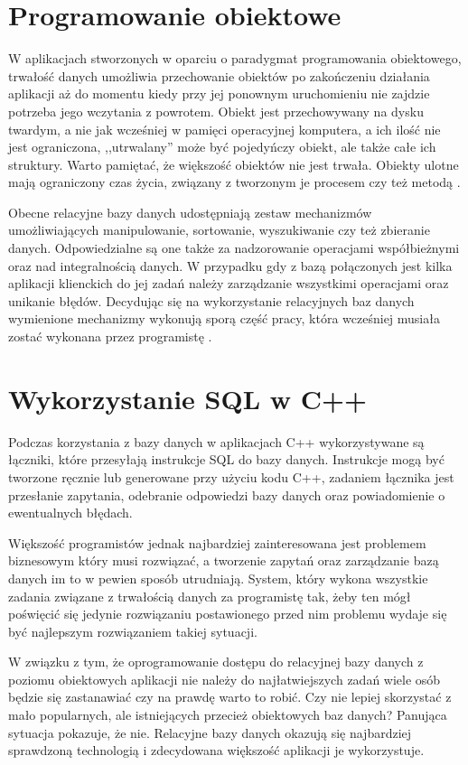 \documentclass[12pt]{report}
\begin{document}
\section{Programowanie obiektowe}

W aplikacjach stworzonych w oparciu o paradygmat programowania obiektowego, trwałość danych umożliwia przechowanie obiektów po zakończeniu działania aplikacji aż do
momentu kiedy przy jej ponownym uruchomieniu nie zajdzie potrzeba jego wczytania z powrotem. Obiekt jest przechowywany na dysku twardym, a nie jak wcześniej w pamięci
operacyjnej komputera, a ich ilość nie jest ograniczona, ,,utrwalany'' może być pojedyńczy obiekt, ale także całe ich struktury. Warto pamiętać, że większość obiektów nie jest
trwała. Obiekty ulotne mają ograniczony czas życia, związany z tworzonym je procesem czy też metodą \cite{hibernate}.

Obecne relacyjne bazy danych udostępniają zestaw mechanizmów umożliwia\-jących manipulowanie, sortowanie, wyszukiwanie czy też zbieranie danych. Odpo\-wiedzialne są 
one także za nadzorowanie operacjami współbieżnymi  oraz nad inte\-gralnością danych. W przypadku gdy z bazą połączonych jest kilka aplikacji klienckich do jej zadań należy
zarządzanie wszystkimi operacjami oraz unikanie błędów. Decydując się na wykorzystanie relacyjnych baz danych wymienione mechanizmy wykonują sporą część pracy, która
wcześniej musiała zostać wykonana przez pro\-gramistę \cite{persistence}.

\section{Wykorzystanie SQL w C++}

Podczas korzystania z bazy danych w aplikacjach C++ wykorzystywane są łączniki, które przesyłają instrukcje SQL do bazy danych. Instrukcje mogą być tworzone ręcznie lub
generowane przy użyciu kodu C++, zadaniem łącznika jest przesłanie zapytania, odebranie odpowiedzi bazy danych oraz powiadomienie o ewentualnych błędach. 

Większość programistów jednak najbardziej zainteresowana jest problemem biznesowym który musi rozwiązać, a tworzenie zapytań oraz zarządzanie bazą danych im to w pewien
sposób utrudniają. System, który wykona wszystkie zadania zwią\-zane z trwałością danych za programistę tak, żeby ten mógł poświęcić się jedynie rozwiązaniu postawionego
przed nim problemu wydaje się być najlepszym rozwią\-zaniem takiej sytuacji.

W związku z tym, że oprogramowanie dostępu do relacyjnej bazy danych z poziomu obiektowych aplikacji nie należy do najłatwiejszych zadań wiele osób będzie się zastanawiać
czy na prawdę warto to robić. Czy nie lepiej skorzystać z mało popularnych, ale istniejących przecież obiektowych baz danych? Panująca sytuacja pokazuje, że nie. Relacyjne
bazy danych okazują się najbardziej spra\-wdzoną technologią i zdecydowana większość aplikacji je wykorzystuje.
\end{document}
